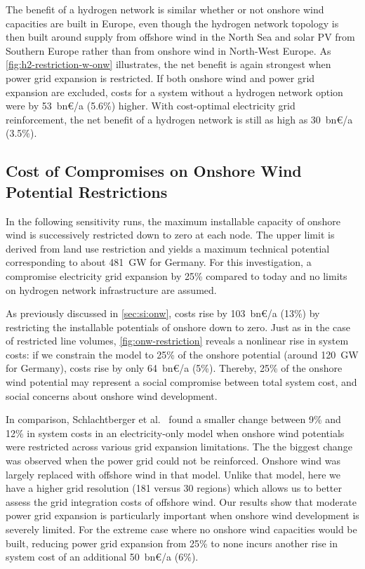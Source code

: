 The benefit of a hydrogen network is similar whether or not onshore wind
capacities are built in Europe, even though the hydrogen network topology is
then built around supply from offshore wind in the North Sea and solar PV from
Southern Europe rather than from onshore wind in North-West Europe. As
\cref{fig:h2-restriction-w-onw} illustrates, the net benefit is again strongest
when power grid expansion is restricted. If both onshore wind and power grid
expansion are excluded, costs for a system without a hydrogen network option
were by 53~bn\euro/a (5.6\%) higher. With cost-optimal electricity
grid reinforcement, the net benefit of a hydrogen network is still as high as
30~bn\euro/a (3.5\%).

\subsection{Cost of Compromises on Onshore Wind Potential Restrictions}
\label{sec:si:onw-compromise}

In the following sensitivity runs, the maximum installable capacity of onshore
wind is successively restricted down to zero at each node. The upper limit is
derived from land use restriction and yields a maximum technical potential
corresponding to about \SI{481}{\giga\watt} for Germany. For this investigation,
a compromise electricity grid expansion by 25\% compared to today and no limits
on hydrogen network infrastructure are assumed.

As previously discussed in \cref{sec:si:onw}, costs rise by 103~bn\euro/a (13\%) by restricting the installable potentials of onshore down to
zero. Just as in the case of restricted line volumes, \cref{fig:onw-restriction}
reveals a nonlinear rise in system costs: if we constrain the model to 25\% of
the onshore potential (around 120~GW for Germany), costs rise by only
64~bn\euro/a (5\%). Thereby, 25\% of the onshore wind potential may
represent a social compromise between total system cost, and social concerns
about onshore wind development.

In comparison, Schlachtberger et al.~ found
a smaller change between 9\% and 12\% in system costs in an electricity-only
model when onshore wind potentials were restricted across various grid expansion
limitations. The the biggest change was observed when the power grid could not
be reinforced. Onshore wind was largely replaced with offshore wind in that
model. Unlike that model, here we have a higher grid resolution (181 versus 30
regions) which allows us to better assess the grid integration costs of offshore
wind. Our results show that moderate power grid expansion is particularly
important when onshore wind development is severely limited. For the extreme
case where no onshore wind capacities would be built, reducing power grid
expansion from 25\% to none incurs another rise in system cost of an additional
50~bn\euro/a (6\%).


